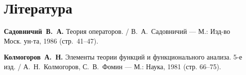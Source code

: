 \section{Література}

\begin{enumerate}[label={[\arabic*]}]
\item \textbf{Садовничий~В.~А.}
Теория операторов. /
В.~А.~Садовничий ---
М.: Изд-во Моск. ун-та, 1986 (стр.~41--47).
\item \textbf{Колмогоров~А.~Н.}
Элементы теории функций и функционального анализа. 5-е изд. /
А.~Н.~Колмогоров, С.~В.~Фомин ---
М.: Наука, 1981 (стр. 66--75).
\end{enumerate}
